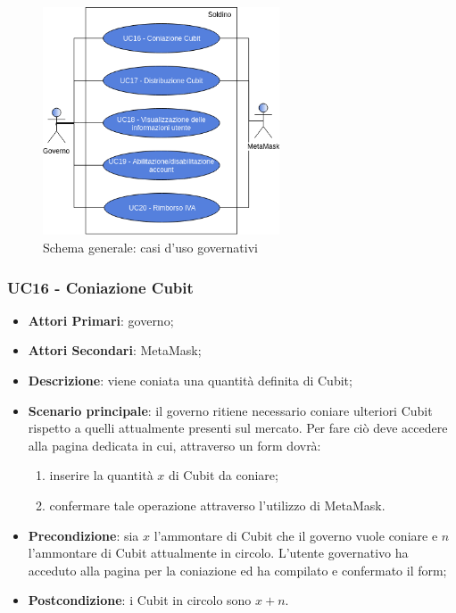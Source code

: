 \begin{figure}[h]
	\includegraphics[width=7cm]{res/images/UC-Governo.png}
	\centering
	\caption{Schema generale: casi d'uso governativi}
\end{figure}
\subsubsection{UC16 - Coniazione Cubit}
\begin{itemize}
	\item \textbf{Attori Primari}: governo;
	\item \textbf{Attori Secondari}: MetaMask\glo;
	\item \textbf{Descrizione}: viene coniata una quantità definita di Cubit\glo;
	
	\item \textbf{Scenario principale}: il governo ritiene necessario coniare ulteriori Cubit rispetto a quelli attualmente presenti sul mercato. Per fare ciò deve accedere alla pagina dedicata in cui, attraverso un form dovrà:
	 \begin{enumerate}[label=\alph*.]
		\item inserire la quantità $x$ di Cubit da coniare;
		\item confermare tale operazione attraverso l'utilizzo di MetaMask\glo.
	\end{enumerate}
	\item \textbf{Precondizione}: sia $x$ l'ammontare di Cubit che il governo 
	vuole coniare e $n$ l'ammontare di Cubit attualmente in circolo. L'utente 
	governativo ha acceduto alla pagina per la coniazione ed ha compilato e 
	confermato il form;
	\item \textbf{Postcondizione}: i Cubit in circolo sono $x+n$.
\end{itemize}
